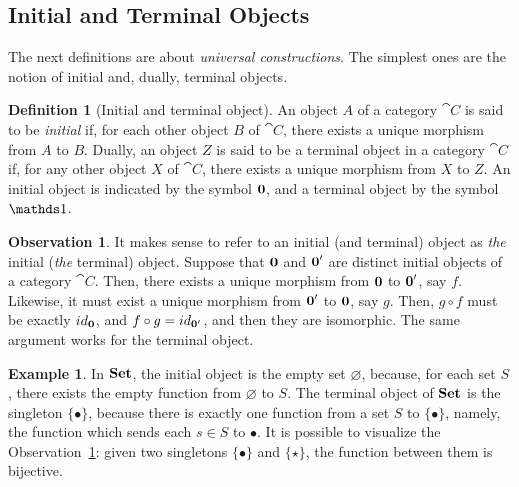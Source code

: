 \documentclass[a4paper, twoside,openright]{report}
\theoremstyle{plain}
\theoremstyle{definition}
\newtheorem{definition}[theorem]{Definition}
\newtheorem{example}[theorem]{Example}
\newtheorem{obs}[theorem]{Observation}
\begin{document}

\subsection{Initial and Terminal Objects}

The next definitions are about \emph{universal constructions}. The simplest ones are the notion of initial and, dually, terminal objects.

\begin{definition}[Initial and terminal object]
    An object $A$ of a category $\cat C$ is said to be \emph{initial} if, for each other object $B$ of $\cat C$, there exists a unique morphism from $A$ to $B$.
    Dually, an object $Z$ is said to be a terminal object in a category $\cat C$ if, for any other object $X$ of $\cat C$, there exists a unique morphism from $X$ to $Z$.
    An initial object is indicated by the symbol $\textbf 0$, and a terminal object by the symbol $\terminal$.
\end{definition}

\begin{obs}\label{obs:terminal_are_isomorph}
    It makes sense to refer to an initial (and terminal) object as \emph{the} initial (\emph{the} terminal) object. Suppose that $\textbf 0$ and $\textbf 0'$ are distinct initial objects of a category $\cat C$. Then, there exists a unique morphism from $\textbf 0$ to $\textbf 0'$, say $f$. Likewise, it must exist a unique morphism from $\textbf 0'$ to $\textbf 0$, say $g$. Then, $g\circ f$ must be exactly $id_{\textbf 0}$, and $f \circ g = id_{\textbf 0'}$, and then they are isomorphic. The same argument works for the terminal object.
\end{obs}

\begin{example}\label{ex:set_init_term}
    In $\mathbf{Set}$, the initial object is the empty set $\varnothing$, because, for each set $S$, there exists the empty function from $\varnothing$ to $S$. The terminal object of $\mathbf{Set}$ is the singleton $\{ \bullet \}$, because there is exactly one function from a set $S$ to $\{ \bullet \}$, namely, the function which sends each $s \in S$ to $\bullet$. It is possible to visualize the Observation~\ref{obs:terminal_are_isomorph}: given two singletons $\{ \bullet \}$ and $\{ \star \}$, the function between them is bijective.
\end{example}
\end{document}
